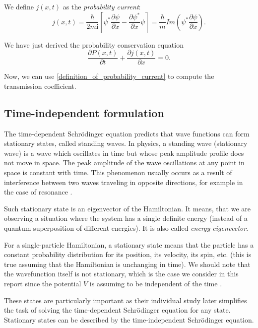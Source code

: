 \documentclass[12pt,a4paper,onecolumn]{article}
\theoremstyle{definition}
\theoremstyle{plain}
\begin{document}
     We define $j(x,t)$ as the \textit{probability current}:
    \begin{equation}
    \label{definition_of_probability_current}
    j(x,t) =  \frac{\hbar}{2m\textbf{i}}
    \left[
    \psi^{*} \frac{\partial \psi}{\partial  x} -
    \frac{\partial \psi^{*}}{\partial  x} \psi 
    \right]=
    \frac{\hbar}{m}
    Im\left(
    \psi^{*} \frac{\partial \psi}{\partial  x} 
    \right).
    \end{equation}
    
    We have just derived the probability conservation equation
    \begin{equation}
            \frac{\partial P(x,t)}{\partial t} + \frac{\partial j(x,t)}{\partial x} = 0.
    \end{equation}

Now, we can use \eqref{definition_of_probability_current} to compute the transmission coefficient.

\subsection{Time-independent formulation}
The time-dependent Schrödinger equation predicts that wave functions can form stationary states, called standing waves.
In physics, a standing wave (stationary wave) is a wave which oscillates in time but whose peak amplitude profile does not move in space. The peak amplitude of the wave oscillations at any point in space is constant with time. This phenomenon usually occurs as a result of interference between two waves traveling in opposite directions, for example in the case of resonance \cite{wikiStatState}.

Such stationary state is an eigenvector of the Hamiltonian. It means, that we are observing a situation where the system has a single definite energy (instead of a quantum superposition of different energies). It is also called \textit{energy eigenvector}.

For a single-particle Hamiltonian, a stationary state means that the particle has a constant probability distribution for its position, its velocity, its spin, etc. (this is true assuming that the Hamiltonian is unchanging in time). We should note that the wavefunction itself is not stationary, which is the case we consider in this report since the potential $V$ is assuming to be independent  of the time \cite{wikiStatState}.


These states are particularly important as their individual study later simplifies the task of solving the time-dependent Schrödinger equation for any state. Stationary states can be described by the time-independent Schrödinger equation. \\
\end{document}
